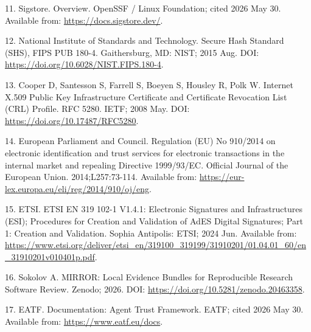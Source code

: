 \documentclass[10pt]{article}
\begin{document}
11. Sigstore. Overview. OpenSSF / Linux Foundation; cited 2026 May 30. Available from: \url{https://docs.sigstore.dev/}.

12. National Institute of Standards and Technology. Secure Hash Standard (SHS), FIPS PUB 180-4. Gaithersburg, MD: NIST; 2015 Aug. DOI: \url{https://doi.org/10.6028/NIST.FIPS.180-4}.

13. Cooper D, Santesson S, Farrell S, Boeyen S, Housley R, Polk W. Internet X.509 Public Key Infrastructure Certificate and Certificate Revocation List (CRL) Profile. RFC 5280. IETF; 2008 May. DOI: \url{https://doi.org/10.17487/RFC5280}.

14. European Parliament and Council. Regulation (EU) No 910/2014 on electronic identification and trust services for electronic transactions in the internal market and repealing Directive 1999/93/EC. Official Journal of the European Union. 2014;L257:73-114. Available from: \url{https://eur-lex.europa.eu/eli/reg/2014/910/oj/eng}.

15. ETSI. ETSI EN 319 102-1 V1.4.1: Electronic Signatures and Infrastructures (ESI); Procedures for Creation and Validation of AdES Digital Signatures; Part 1: Creation and Validation. Sophia Antipolis: ETSI; 2024 Jun. Available from: \url{https://www.etsi.org/deliver/etsi_en/319100_319199/31910201/01.04.01_60/en_31910201v010401p.pdf}.

16. Sokolov A. MIRROR: Local Evidence Bundles for Reproducible Research Software Review. Zenodo; 2026. DOI: \url{https://doi.org/10.5281/zenodo.20463358}.

17. EATF. Documentation: Agent Trust Framework. EATF; cited 2026 May 30. Available from: \url{https://www.eatf.eu/docs}.
\end{document}
